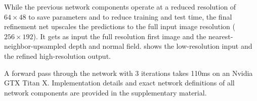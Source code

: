 \documentclass[10pt,twocolumn,letterpaper]{article}
\begin{document}
While the previous network components operate at a reduced resolution of $64\times48$ to save parameters and to reduce training and test time, the final refinement net upscales the predictions to the full input image resolution ($256\times192$).  
It gets as input the full resolution first image and the nearest-neighbor-upsampled depth and normal field.
 shows the low-resolution input and the refined high-resolution output.

A forward pass through the network with 3 iterations takes 110ms on an Nvidia GTX Titan X. 
Implementation details and exact network definitions of all network components are provided in the supplementary material.

% 
\end{document}
